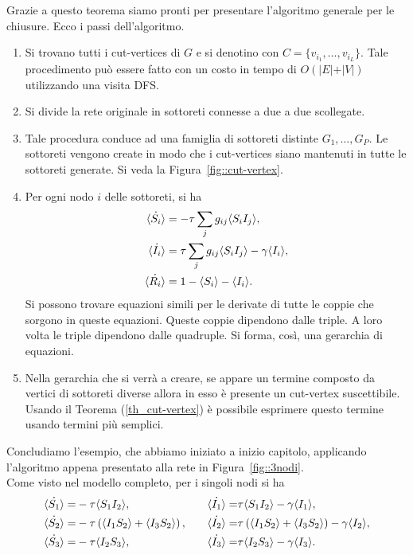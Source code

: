 Grazie a questo teorema siamo pronti per presentare l'algoritmo generale per le chiusure. Ecco i passi dell'algoritmo.
\begin{enumerate}
	\item Si trovano tutti i cut-vertices di $G$ e si denotino con $C=\{ v_{i_1}, \dots, v_{i_L}\}$. Tale procedimento pu\`o essere fatto con  un costo in tempo di $O(\vert E \vert + \vert V \vert)$ utilizzando una visita DFS. 
	\item Si divide la rete originale in sottoreti connesse a due a due scollegate.
	\item Tale procedura conduce ad una famiglia di sottoreti distinte $G_1, \dots, G_P$. Le sottoreti vengono create in modo che i cut-vertices siano mantenuti in tutte le sottoreti generate. Si veda la Figura~\ref{fig::cut-vertex}.
	\item Per ogni nodo $i$ delle sottoreti, si ha 
	\begin{equation*}
	\begin{aligned}
\dot{\langle S_i \rangle} &= -\tau \sum_j g_{ij} \langle S_iI_j \rangle,\\
\dot{\langle I_i \rangle} &= \tau \sum_j g_{ij} \langle S_iI_j \rangle-\gamma\langle I_i \rangle,\\
\dot{\langle R_i \rangle} &= 1 -\langle S_i \rangle -\langle I_i \rangle.
		\end{aligned}
	\end{equation*}
	Si possono trovare  equazioni simili per le derivate di tutte le coppie che sorgono in queste equazioni. Queste coppie dipendono dalle triple. A loro volta le triple dipendono dalle quadruple. Si forma, cos\`i, una gerarchia di equazioni.
	\item Nella gerarchia che si verr\`a a creare, se appare un termine composto da  vertici di sottoreti diverse allora in esso \`e presente un cut-vertex suscettibile. Usando il Teorema (\ref{th_cut-vertex}) \`e possibile esprimere questo termine usando termini pi\`u semplici.
\end{enumerate}
\newpage
Concludiamo l'esempio, che abbiamo iniziato a inizio capitolo, applicando l'algoritmo appena presentato alla rete in Figura~\ref{fig::3nodi}.\\
Come visto nel modello completo, per i singoli nodi si ha \begin{equation*}
\begin{aligned}
	\dot{\langle S_1 \rangle} = & -\tau \langle  S_1 I_2 \rangle, 
\quad &
	\dot{\langle I_1 \rangle} = & \tau \langle S_1 I_2 \rangle-\gamma \langle I_1 \rangle, 
\\
	\dot{\langle S_2 \rangle} = & -\tau \left(  \langle  I_1 S_2 \rangle + \langle I_3S_2 \rangle \right),	
\quad & 
	\dot{\langle I_2 \rangle} = & \tau \left(  \langle  I_1 S_2 \rangle + \langle I_3S_2 \rangle \right)-\gamma \langle I_2 \rangle,
\\
	\dot{\langle S_3 \rangle} = & -\tau \langle  I_2 S_3 \rangle,
\quad & 
	\dot{\langle I_3 \rangle} = & \tau \langle  I_2 S_3 \rangle-\gamma \langle I_3 \rangle.
 \end{aligned}
\end{equation*}
